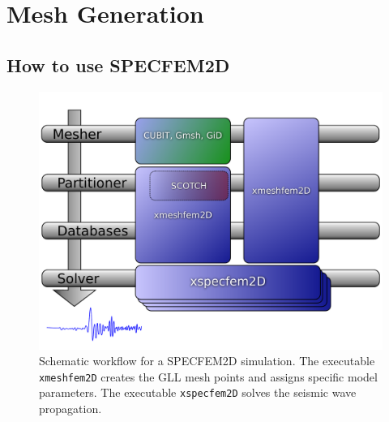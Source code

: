 
\chapter{Mesh Generation}


\section{How to use SPECFEM2D}

\begin{figure}[htbp]
\centering
\includegraphics[width=.6\textwidth]{figures/workflow.pdf}

\caption{Schematic workflow for a SPECFEM2D simulation. The executable \texttt{xmeshfem2D} creates the GLL mesh points and assigns specific model parameters. The executable \texttt{xspecfem2D} solves the seismic wave propagation.}

\label{fig:workflow.databases}
\end{figure}

